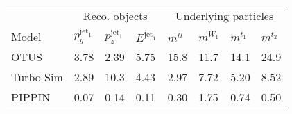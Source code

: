\begin{tabular}{llllllll}
    \toprule
              & \multicolumn{3}{c}{Reco. objects} & \multicolumn{4}{c}{Underlying particles}                                                                           \\
    \cmidrule(l){2-4} \cmidrule(l){5-8}
    Model     & $p_y^{\text{jet}_1}$              & $p_z^{\text{jet}_1}$                     & $E^{\text{jet}_1}$ & $m^{t\bar{t}}$ & $m^{W_1}$ & $m^{t_1}$ & $m^{t_2}$ \\    \midrule
    OTUS      & 3.78                              & 2.39                                     & 5.75               & 15.8           & 11.7      & 14.1      & 24.9      \\
    Turbo-Sim & 2.89                              & 10.3                                     & 4.43               & 2.97           & 7.72      & 5.20      & 8.52      \\
    PIPPIN    & 0.07                              & 0.14                                     & 0.11               & 0.30           & 1.75      & 0.74      & 0.50      \\
    \bottomrule
\end{tabular}
